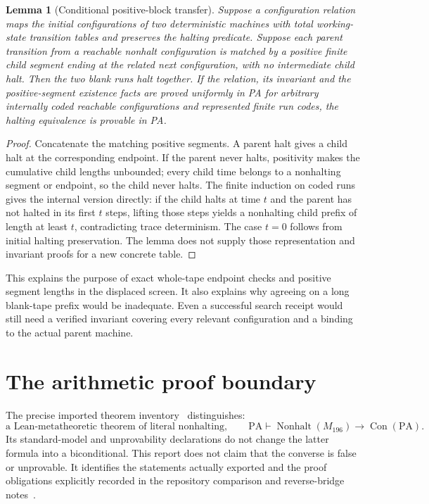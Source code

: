 \documentclass[11pt,letterpaper]{article}
\newtheorem{lemma}[theorem]{Lemma}
\newcommand{\PA}{\mathrm{PA}}
\newcommand{\Con}{\operatorname{Con}}
\newcommand{\Nonhalt}{\operatorname{Nonhalt}}
\newcommand{\imp}{\mathbin{\to}}
\begin{document}
\begin{lemma}[Conditional positive-block transfer]
Suppose a configuration relation maps the initial configurations of two
deterministic machines with total working-state transition tables and
preserves the halting predicate. Suppose each
parent transition from a reachable nonhalt configuration is matched by a
positive finite child segment ending at the related next configuration,
with no intermediate child halt. Then the two blank runs halt together.
If the relation, its invariant and the positive-segment existence facts are
proved uniformly in PA for arbitrary internally coded reachable
configurations and represented finite run codes, the halting equivalence
is provable in PA.
\end{lemma}
\begin{proof}
Concatenate the matching positive segments. A parent halt gives a child halt
at the corresponding endpoint. If the parent never halts, positivity makes
the cumulative child lengths unbounded; every child time belongs to a
nonhalting segment or endpoint, so the child never halts. The finite induction
on coded runs gives the internal version directly: if the child halts at
time $t$ and the parent has not halted in its first $t$ steps, lifting those
steps yields a nonhalting child prefix of length at least $t$, contradicting
trace determinism. The case $t=0$ follows from initial halting preservation.
The lemma does not supply those representation and
invariant proofs for a new concrete table.
\end{proof}

This explains the purpose of exact whole-tape endpoint checks and positive
segment lengths in the displaced screen. It also explains why agreeing on
a long blank-tape prefix would be inadequate. Even a successful search
receipt would still need a verified invariant covering every relevant
configuration and a binding to the actual parent machine.

\section{The arithmetic proof boundary}
\label{sec:proof}

The precise imported theorem inventory~\cite{inventory} distinguishes:
\[
 \text{a Lean-metatheoretic theorem of literal nonhalting},
 \qquad
 \PA\vdash\Nonhalt(M_{196})\imp\Con(\PA).
\]
Its standard-model and unprovability declarations do not change the latter
formula into a biconditional. This report does not claim that the converse
is false or unprovable. It identifies the statements actually exported and
the proof obligations explicitly recorded in the repository comparison
and reverse-bridge notes~\cite{comparison,bridge}.
\end{document}
